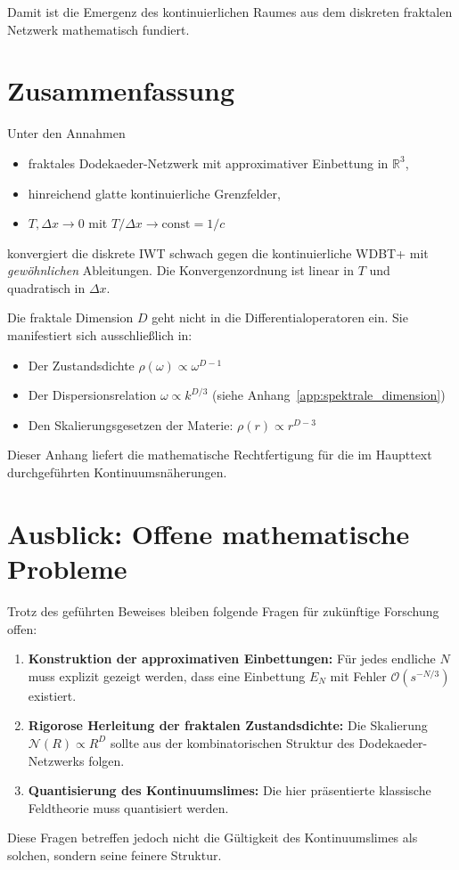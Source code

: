 Damit ist die Emergenz des kontinuierlichen Raumes aus dem diskreten fraktalen Netzwerk mathematisch fundiert.

\section{Zusammenfassung}
\label{app:kontinuumslimes_zusammenfassung}

Unter den Annahmen

\begin{itemize}
    \item fraktales Dodekaeder-Netzwerk mit approximativer Einbettung in \( \mathbb{R}^3 \),
    \item hinreichend glatte kontinuierliche Grenzfelder,
    \item \( T, \Delta x \to 0 \) mit \( T/\Delta x \to \text{const} = 1/c \)
\end{itemize}

konvergiert die diskrete IWT schwach gegen die kontinuierliche WDBT+ mit \emph{gewöhnlichen} Ableitungen. Die Konvergenzordnung ist linear in \( T \) und quadratisch in \( \Delta x \).

Die fraktale Dimension \( D \) geht nicht in die Differentialoperatoren ein. Sie manifestiert sich ausschließlich in:

\begin{itemize}
    \item Der Zustandsdichte \( \rho(\omega) \propto \omega^{D-1} \)
    \item Der Dispersionsrelation \( \omega \propto k^{D/3} \) (siehe Anhang~\ref{app:spektrale_dimension})
    \item Den Skalierungsgesetzen der Materie: \( \rho(r) \propto r^{D-3} \)
\end{itemize}

Dieser Anhang liefert die mathematische Rechtfertigung für die im Haupttext durchgeführten Kontinuumsnäherungen.

\section{Ausblick: Offene mathematische Probleme}
\label{app:kontinuumslimes_ausblick}

Trotz des geführten Beweises bleiben folgende Fragen für zukünftige Forschung offen:

\begin{enumerate}
    \item \textbf{Konstruktion der approximativen Einbettungen:} Für jedes endliche \( N \) muss explizit gezeigt werden, dass eine Einbettung \( E_N \) mit Fehler \( \mathcal{O}(s^{-N/3}) \) existiert.
    \item \textbf{Rigorose Herleitung der fraktalen Zustandsdichte:} Die Skalierung \( \mathcal{N}(R) \propto R^D \) sollte aus der kombinatorischen Struktur des Dodekaeder-Netzwerks folgen.
    \item \textbf{Quantisierung des Kontinuumslimes:} Die hier präsentierte klassische Feldtheorie muss quantisiert werden.
\end{enumerate}

Diese Fragen betreffen jedoch nicht die Gültigkeit des Kontinuumslimes als solchen, sondern seine feinere Struktur.